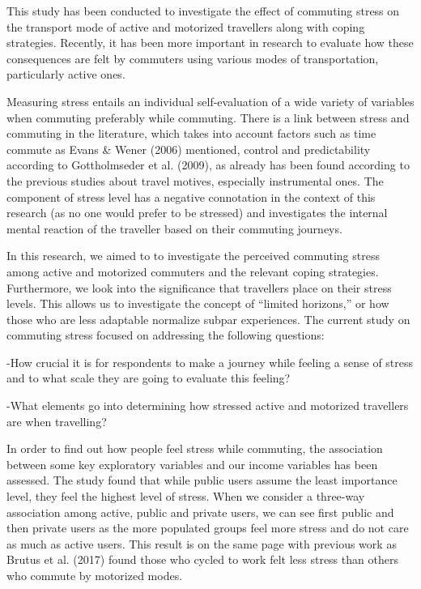 \documentclass[
11pt, %
oneside, %
english, %
singlespacing, %
]{macthesis} %
\begin{document}
This study has been conducted to investigate the effect of commuting stress on the transport mode of active and motorized travellers along with coping strategies. Recently, it has been more important in research to evaluate how these consequences are felt by commuters using various modes of transportation, particularly active ones.

Measuring stress entails an individual self-evaluation of a wide variety of variables when commuting preferably while commuting. There is a link between stress and commuting in the literature, which takes into account factors such as time commute as Evans \& Wener (2006) mentioned, control and predictability according to Gottholmseder et al. (2009), as already has been found according to the previous studies about travel motives, especially instrumental ones. The component of stress level has a negative connotation in the context of this research (as no one would prefer to be stressed) and investigates the internal mental reaction of the traveller based on their commuting journeys.

In this research, we aimed to to investigate the perceived commuting stress among active and motorized commuters and the relevant coping strategies. Furthermore, we look into the significance that travellers place on their stress levels. This allows us to investigate the concept of ``limited horizons,'' or how those who are less adaptable normalize subpar experiences. The current study on commuting stress focused on addressing the following questions:

-How crucial it is for respondents to make a journey while feeling a sense of stress and to what scale they are going to evaluate this feeling?

-What elements go into determining how stressed active and motorized travellers are when travelling?

In order to find out how people feel stress while commuting, the association between some key exploratory variables and our income variables has been assessed. The study found that while public users assume the least importance level, they feel the highest level of stress. When we consider a three-way association among active, public and private users, we can see first public and then private users as the more populated groups feel more stress and do not care as much as active users. This result is on the same page with previous work as Brutus et al. (2017) found those who cycled to work felt less stress than others who commute by motorized modes.
\end{document}
